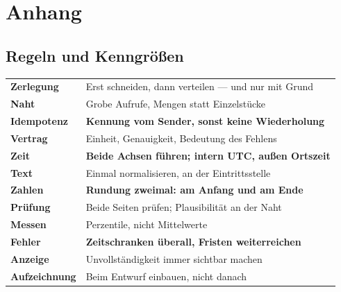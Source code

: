 \appendix
\part{Anhang}

\newcommand{\lit}[3]{\vspace{5pt}\noindent\textbf{[#1]} #2\par\nopagebreak\vspace{1pt}{\small\itshape\color{grau} #3}\par\vspace{2pt}}

\chapter{Regeln und Kenngrößen}

\begin{merksatz}
\begin{center}
{\small
\renewcommand{\arraystretch}{1.5}
\begin{tabular}{@{}P{3.2cm}P{5.4cm}@{}}
\toprule
\textbf{Zerlegung} & Erst schneiden, dann verteilen --- und nur mit Grund\\
\textbf{Naht} & Grobe Aufrufe, Mengen statt Einzelstücke\\
\textbf{Idempotenz} & \textbf{Kennung vom Sender, sonst keine Wiederholung}\\
\textbf{Vertrag} & Einheit, Genauigkeit, Bedeutung des Fehlens\\
\textbf{Zeit} & \textbf{Beide Achsen führen; intern UTC, außen Ortszeit}\\
\textbf{Text} & Einmal normalisieren, an der Eintrittsstelle\\
\textbf{Zahlen} & \textbf{Rundung zweimal: am Anfang und am Ende}\\
\textbf{Prüfung} & Beide Seiten prüfen; Plausibilität an der Naht\\
\textbf{Messen} & Perzentile, nicht Mittelwerte\\
\textbf{Fehler} & \textbf{Zeitschranken überall, Fristen weiterreichen}\\
\textbf{Anzeige} & Unvollständigkeit immer sichtbar machen\\
\textbf{Aufzeichnung} & Beim Entwurf einbauen, nicht danach\\
\bottomrule
\end{tabular}}
\end{center}
\end{merksatz}

